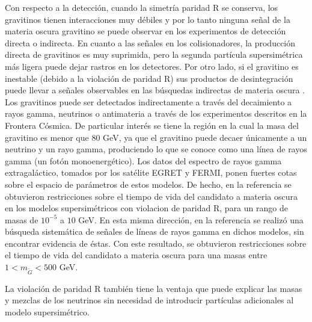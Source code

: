 Con respecto a la detección, cuando la simetría paridad R se conserva,
los gravitinos tienen interacciones muy débiles y por lo tanto ninguna
señal de la materia oscura gravitino se puede observar en los
experimentos de detección directa o indirecta. En cuanto a las señales
en los colisionadores, la producción directa de gravitinos es muy
suprimida, pero la segunda partícula supersimétrica más ligera puede
dejar rastros en los detectores. Por otro lado, si el gravitino es
inestable (debido a la violación de paridad R) sus productos de
desintegración puede llevar a señales observables en las búsquedas
indirectas de materia oscura
\cite{Bertone:2007aw,Ibarra:2007wg,Covi:2008jy,Ibarra:2008qg}. Los
gravitinos puede ser detectados indirectamente a través del
decaimiento a rayos gamma, neutrinos o antimateria a través de los
experimentos descritos en la Frontera Cósmica. De particular
interés se tiene la región en la cual la masa del gravitino es menor
que 80 GeV, ya que el gravitino puede decaer únicamente a un neutrino
y un rayo gamma, produciendo lo que se conoce como una línea de rayos
gamma (un fotón monoenergético). Los datos del espectro de rayos gamma
extragaláctico, tomados por los satélite EGRET y FERMI, ponen fuertes
cotas sobre el espacio de parámetros de estos modelos. De hecho, en la
referencia \cite{Yuksel:2007dr} se obtuvieron restricciones sobre el
tiempo de vida del candidato a materia oscura en los modelos
supersimétricos con violacion de paridad R, para un rango de masas de
$10^{-5}$ a $10$ GeV. En esta misma dirección, en la referencia
\cite{Vertongen:2011mu} se realizó una búsqueda sistemática de señales
de líneas de rayos gamma en dichos modelos, sin encontrar evidencia de
éstas. Con este resultado, se obtuvieron restricciones sobre el tiempo
de vida del candidato a materia oscura para una masas entre
$1<m_{\tilde G}< 500$ GeV.

La violación de paridad R también tiene la ventaja que puede explicar
las masas y mezclas de los neutrinos sin necesidad de introducir
partículas adicionales al modelo supersimétrico. 

